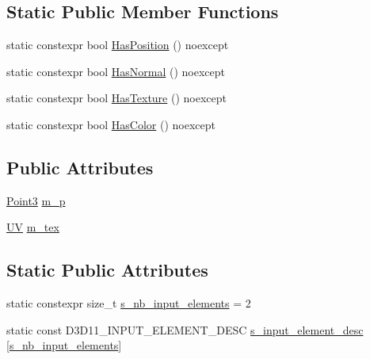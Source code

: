 \subsection*{Static Public Member Functions}
\begin{DoxyCompactItemize}
\item 
static constexpr bool \hyperlink{structmage_1_1_vertex_position_texture_a73b976c9cf9259da522a84ab4075db78}{Has\+Position} () noexcept
\item 
static constexpr bool \hyperlink{structmage_1_1_vertex_position_texture_a0b50c61258a2778faf9141a916e6b4d0}{Has\+Normal} () noexcept
\item 
static constexpr bool \hyperlink{structmage_1_1_vertex_position_texture_a8812d80a2f933fdbea33cfd356245c2d}{Has\+Texture} () noexcept
\item 
static constexpr bool \hyperlink{structmage_1_1_vertex_position_texture_ae25de798fcf1dd6383ed9b85e20cae54}{Has\+Color} () noexcept
\end{DoxyCompactItemize}
\subsection*{Public Attributes}
\begin{DoxyCompactItemize}
\item 
\hyperlink{structmage_1_1_point3}{Point3} \hyperlink{structmage_1_1_vertex_position_texture_aa06cfd538a1af9a52ec9114b3d627291}{m\+\_\+p}
\item 
\hyperlink{structmage_1_1_u_v}{UV} \hyperlink{structmage_1_1_vertex_position_texture_af742cea48363bd9a1574d36a2cf5b2c6}{m\+\_\+tex}
\end{DoxyCompactItemize}
\subsection*{Static Public Attributes}
\begin{DoxyCompactItemize}
\item 
static constexpr size\+\_\+t \hyperlink{structmage_1_1_vertex_position_texture_a185dc518d4f2f23d69916978f71355e2}{s\+\_\+nb\+\_\+input\+\_\+elements} = 2
\item 
static const D3\+D11\+\_\+\+I\+N\+P\+U\+T\+\_\+\+E\+L\+E\+M\+E\+N\+T\+\_\+\+D\+E\+SC \hyperlink{structmage_1_1_vertex_position_texture_a80b0fac785de688b33c155ea212c2cf3}{s\+\_\+input\+\_\+element\+\_\+desc} \mbox{[}\hyperlink{structmage_1_1_vertex_position_texture_a185dc518d4f2f23d69916978f71355e2}{s\+\_\+nb\+\_\+input\+\_\+elements}\mbox{]}
\end{DoxyCompactItemize}



